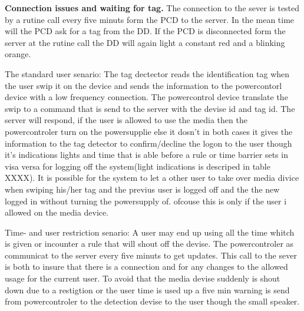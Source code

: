 \textbf{Connection issues and waiting for tag.} \n
The connection to the sever is tested by a rutine call every five minuts form the PCD to the server. In the mean time will the PCD ask for a tag from the DD. If the PCD is disconnected form the server at the rutine call the DD will again light a constant red and a blinking orange.    
  


The standard user senario:
The tag dectector reads the identification tag when the user swip it on the device and sends the information to the powercontorl device with a low frequency connection.
The powercontrol device translate the swip to a command that is send to the server with the devise id and tag id. The server will respond, if the user is allowed to use the media then the powercontroler turn on the powersupplie else it dosn't in both cases it gives the information to the tag detector to confirm/decline the logon to the user though it's indications lights and time that is able before a rule or time barrier sets in visa versa for logging off the system(light indications is descriped in table XXXX). It is possible for the system to let a other user to take over media divice when swiping his/her tag and the previus user is logged off and the the new logged in without turning the powersupply of. ofcouse this is only if the user i allowed on the media device. 

Time- and user restriction senario:
A user may end up using all the time whitch is given or incounter a rule that will shout off the devise. The powercontroler as communicat to the server every five minuts to get updates. This call to the sever is both to insure that there is a connection and for any changes to the allowed usage for the current user. To avoid that the media devise suddenly is shout down due to a restigtion or the user time is used up a five min warning is send from powercontroler to the detection devise to the user though the small speaker. 

